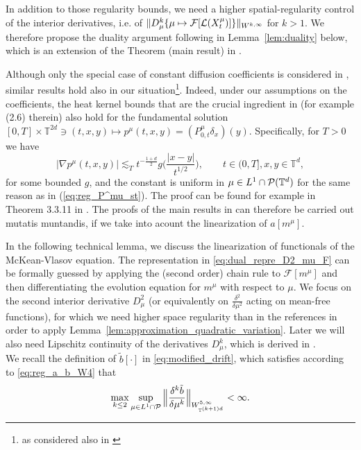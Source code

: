 In addition to those regularity bounds, we need a higher spatial-regularity control of the interior derivatives, i.e. of $\|D^k_\mu\{\mu \mapsto \mathcal{F}[\mathcal{L}(X^{\mu}_{t})] \}\|_{W^{k,\infty}}$ for $k>1$. We therefore propose the duality argument following in Lemma~\ref{lem:duality} below, which is an extension of the Theorem (main result) in \cite{T21}.

\begin{rem}\label{rem:general-diffusion}Although only the special case of constant diffusion coefficients is considered in \cite{T21}, similar results hold also in our situation\footnote{as considered also in \cite{BLPC17}}. Indeed, under our assumptions on the coefficients, the heat kernel bounds that are the crucial ingredient in \cite{T21} (for example (2.6) therein) also hold for the fundamental solution $[0,T]\times \mathbb{T}^{2d} \ni (t,x,y) \mapsto p^{\mu}(t,x,y) = (P^{\mu}_{0,t}\delta_x)(y)$. Specifically, for $T>0$ we have
\begin{equation}
    |\nabla p^{\mu}(t,x,y)| \lesssim_T t^{-\frac{1+d}{2}} g\Big(\frac{|x-y|}{t^{1/2}}\Big), \qquad t \in (0,T],x,y \in \mathbb{T}^d,
    \end{equation}
for some bounded $g$, and the constant is uniform in $\mu \in L^1 \cap \mathcal{P}(\mathbb{T}^d)$ for the same reason as in (\ref{eq:reg_P^mu_st}). The proof can be found for example in Theorem 3.3.11 in \cite{S08}. The proofs of the main results in \cite{T21} can therefore be carried out mutatis muntandis, if we take into acount the linearization of $a[m^{\mu}]$. 
\end{rem}

In the following technical lemma, we discuss the linearization of functionals of the McKean-Vlasov equation. The representation in \eqref{eq:dual_repre_D2_mu_F} can be formally guessed by applying the (second order) chain rule to $\mathcal F[m^\mu]$ and then differentiating the evolution equation for $m^\mu$ with respect to $\mu$. We focus on the second interior derivative $D^2_\mu$ (or equivalently on $\frac{\delta^2}{\delta \mu^2}$ acting on mean-free functions), for which we need higher space regularity than in the references in order to apply Lemma~\ref{lem:approximation_quadratic_variation}. Later we will also need Lipschitz continuity of the derivatives $D^k_\mu$, which is derived in \cite{T21,DT21}.\\

We recall the definition of $\tilde{b}[\cdot]$ in \eqref{eq:modified_drift}, which satisfies according to \eqref{eq:reg_a_b_W4} that 
\[
\max_{k \leq 2} \sup_{\mu \in L^1 \cap \mathcal{P}} \Big\|\frac{\delta^k \tilde{b}}{\delta \mu^k}  \Big\|_{W^{5,\infty}_{\mathbb{T}^{(k+1)d}}} < \infty.
\]

